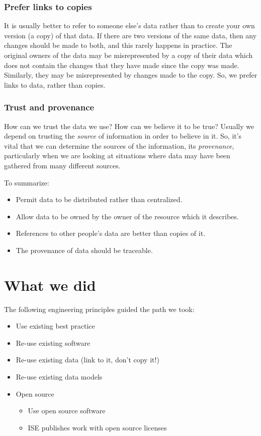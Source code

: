 \documentclass[11pt,twoside,a4paper]{article}
\begin{document}
\subsubsection{Prefer links to copies}
It is usually better to refer to someone else's data rather than to create your own version (a copy) of that data.
If there are two versions of the same data, then any changes should be made to both, and this rarely happens in practice.
The original owners of the data may be misrepresented by a copy of their data which does not contain the changes that they have made since the copy was made.
Similarly, they may be misrepresented by changes made to the copy.
So, we prefer links to data, rather than copies.

\subsubsection{Trust and provenance}
How can we trust the data we use? How can we believe it to be true?
Usually we depend on trusting the \textit{source} of information in order to believe in it.
So, it's vital that we can determine the sources of the information,
its \textit{provenance},
particularly when we are looking at situations where data may have been gathered from many different sources.

To summarize:
\begin{itemize}
  \item Permit data to be distributed rather than centralized.
  \item Allow data to be owned by the owner of the resource which it describes.
  \item References to other people's data are better than copies of it.
  \item The provenance of data should be traceable.  
\end{itemize}


\section{What we did}
The following engineering principles guided the path we took:
  \begin{itemize}
    \item Use existing best practice
    \item Re-use existing software
    \item Re-use existing data (link to it, don't copy it!)
    \item Re-use existing data models
    \item Open source
      \begin{itemize}
	\item Use open source software
	\item ISE publishes work with open source licenses
      \end{itemize}
  \end{itemize}
\end{document}
